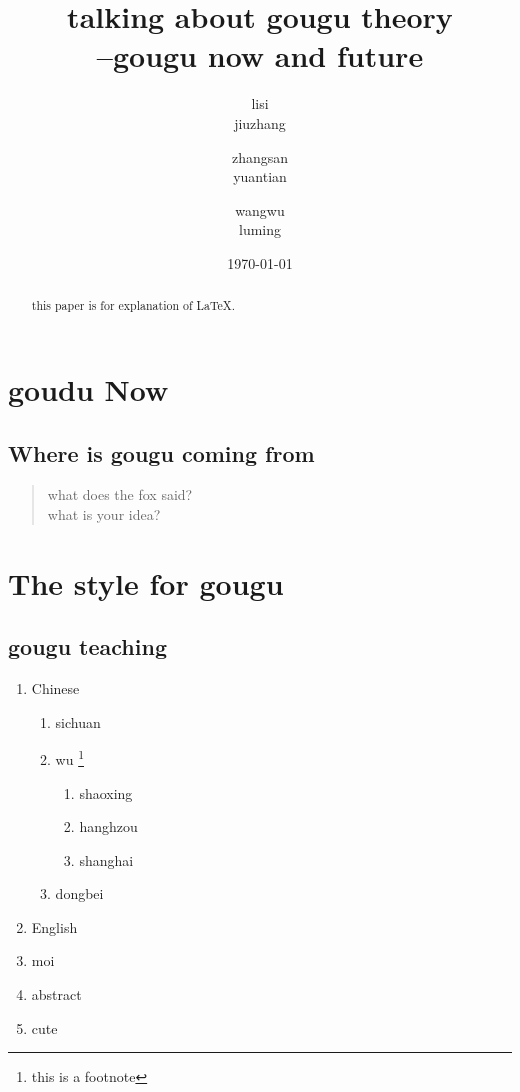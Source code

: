 \documentclass[a4paper]{article}
\title{talking about gougu theory\\--gougu now and future}
\author{lisi\\jiuzhang \and zhangsan\\yuantian \and wangwu\\luming}
\date{\today}
\begin{document}
\maketitle

\tableofcontents

\begin{abstract}
    this paper is for explanation of \LaTeX{}.
\end{abstract}

\section{goudu Now}
\subsection{Where is gougu coming from}

\begin{quotation}
    what does the fox said? \cite{bigler_daily_2019} \\

    what is  your idea? \cite{jourdan_how_2020,wu_describing_2017,jourdan_effect_2019}
\end{quotation}



\section{The style for gougu}
\subsection{gougu teaching}

\begin{enumerate}
    \item Chinese
          \begin{enumerate}
              \item sichuan
              \item wu \footnote{this is a footnote}
                    \begin{enumerate}
                        \item shaoxing
                        \item hanghzou
                        \item shanghai
                    \end{enumerate}
              \item dongbei

          \end{enumerate}
    \item English
    \item moi
    \item abstract
    \item cute
\end{enumerate}
\end{document}
